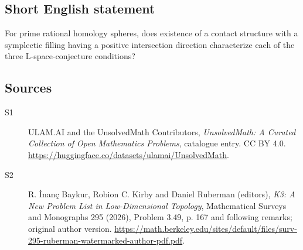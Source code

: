 \documentclass[11pt]{article}
\begin{document}
\subsection{Short English statement}
For prime rational homology spheres, does existence of a contact structure with a symplectic filling having a positive intersection direction characterize each of the three L-space-conjecture conditions?
\subsection{Sources}
\begin{description}
\item[\hypertarget{source:statement:1}{S1}] ULAM.AI and the UnsolvedMath Contributors, \emph{UnsolvedMath: A Curated Collection of Open Mathematics Problems}, catalogue entry. CC BY 4.0. \url{https://huggingface.co/datasets/ulamai/UnsolvedMath}.
\item[\hypertarget{source:statement:2}{S2}] R. İnanç Baykur, Robion C. Kirby and Daniel Ruberman (editors), \emph{K3: A New Problem List in Low-Dimensional Topology}, Mathematical Surveys and Monographs 295 (2026), Problem 3.49, p. 167 and following remarks; original author version. \url{https://math.berkeley.edu/sites/default/files/surv-295-ruberman-watermarked-author-pdf.pdf}.
\end{description}
\label{end:statement}
\end{document}
